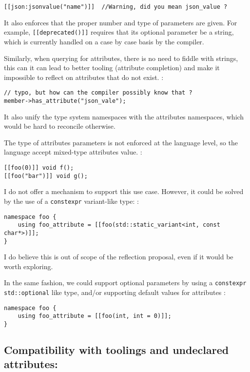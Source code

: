 \documentclass[a4paper,11pt]{article}
\begin{document}
\begin{lstlisting}
[[json:jsonvalue("name")]]  //Warning, did you mean json_value ?
\end{lstlisting}

It also enforces that the proper number and type of parameters are
given. For example, \texttt{{[}{[}deprecated(){]}{]}} requires that its
optional parameter be a string, which is currently handled on a case by
case basis by the compiler.

Similarly, when querying for attributes, there is no need to fiddle with
strings, this can it can lead to better tooling (attribute completion)
and make it impossible to reflect on attributes that do not exist. :

\begin{lstlisting}
// typo, but how can the compiler possibly know that ?
member->has_attribute("json_vale");
\end{lstlisting}

It also unify the type system namespaces with the attributes namespaces,
which would be hard to reconcile otherwise.

The type of attributes parameters is not enforced at the language level,
so the language accept mixed-type attributes value. :

\begin{lstlisting}
[[foo(0)]] void f();
[[foo("bar")]] void g();
\end{lstlisting}

I do not offer a mechanism to support this use case. However, it could
be solved by the use of a \texttt{constexpr} variant-like type: :

\begin{lstlisting}
namespace foo {
    using foo_attribute = [[foo(std::static_variant<int, const char*>)]];
}
\end{lstlisting}

I do believe this is out of scope of the reflection proposal, even if it
would be worth exploring.

In the same fashion, we could support optional parameters by using a
\texttt{constexpr} \texttt{std::optional} like type, and/or supporting
default values for attributes :

\begin{lstlisting}
namespace foo {
    using foo_attribute = [[foo(int, int = 0)]];
}
\end{lstlisting}

\subsection{Compatibility with toolings and undeclared
attributes:}\label{compatibility-with-toolings-and-undeclared-attributes}
\end{document}
